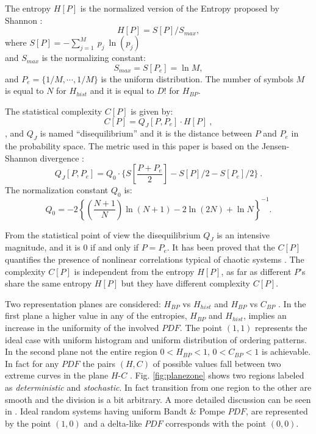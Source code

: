 The entropy $H[P]$ is the normalized version of the Entropy proposed by Shannon \cite{Shannon1949a}:
\begin{equation}\label{eq:sha}
H[P] = S[P] /S_{max},
\end{equation}
where $S[P]=-\sum _{j=1}^{M}~p_j~\ln( p_j )$\\ and $S_{max}$ is
the normalizing constant:
\begin{equation}
\label{eq:Smax} S_{max}= S[P_e] = \ln M,
\end{equation}
and $P_e=\{ 1/M, \cdots,1/M\}$ is the uniform distribution. The number of symbols $M$ is equal to $N$ for $H_{hist}$ and it is equal to $D!$ for $H_{BP}$.

The statistical complexity $C[P]$ is given by:
\begin{equation}
\label{eq:inten}
C[{P}]=Q_{J}[{P,P_e}]\cdot H[{P}] \ ,
\end{equation}
, and
$Q_{J}$ is named ``disequilibrium'' and it is the distance between $P$ and $P_e$ 
 in the probability space. The metric used in this paper is based on the Jensen-Shannon divergence
 \cite{Lamberti2004}:
\begin{equation}
\label{eq:disequi}
Q_{J}[{P,P_e}]= Q_0 \cdot \{S[\frac{P+P_e}{2}]-S[P]/2-S[P_e]/2 \} \ .
\end{equation}
The normalization constant $Q_0$ is:
\begin{equation}
\label{eq:q0j}
Q_0=-2 \left\{ \left( \frac{N+1}{N} \right) \ln(N+1) - 2 \ln(2N) + \ln N \right\}^{-1} .
\end{equation}

From the statistical point of view the disequilibrium $Q_J$ is an
intensive magnitude, and it is $0$ if and only if $P=P_e$. It has
been proved that the $C[P]$ quantifies the presence of nonlinear
correlations typical of chaotic systems
\cite{Martin2003,Lamberti2004}. The complexity $C[P]$ is
independent from the entropy $H[P]$, as far as different $P$'s share
the same entropy $H[P]$ but they have different  complexity
$C[P]$.

Two representation planes are considered: $H_{BP}$ vs $H_{hist}$ \cite{DeMicco2008} and $H_{BP}$ vs $C_{BP}$ \cite{Rosso2007C}. In the first plane a higher value in any of the entropies,  $H_{BP}$ and $H_{hist}$, implies an increase in the uniformity of the involved $PDF$. The point $(1,1)$ represents the ideal case with uniform histogram and uniform distribution of ordering patterns.  In the second plane not the entire region $0<H_{BP}<1$, $0<C_{BP}<1$ is achievable. In fact for any $PDF$ the pairs $(H,C)$ of possible values fall between two extreme curves in the plane $H$-$C$ \cite{Anteneodo1996}. Fig. \ref{fig:planezone} shows two regions labeled as \emph{deterministic} and \emph{stochastic}. In fact transition from one region to the other are smooth and the division is a bit arbitrary. A more detailed discussion can be seen in \cite{Rosso2007C}. Ideal random systems having uniform Bandt \& Pompe $PDF$, are represented by the point $(1,0)$ \cite{Gonzalez2005} and a delta-like $PDF$ corresponds with the point $(0,0)$. 


